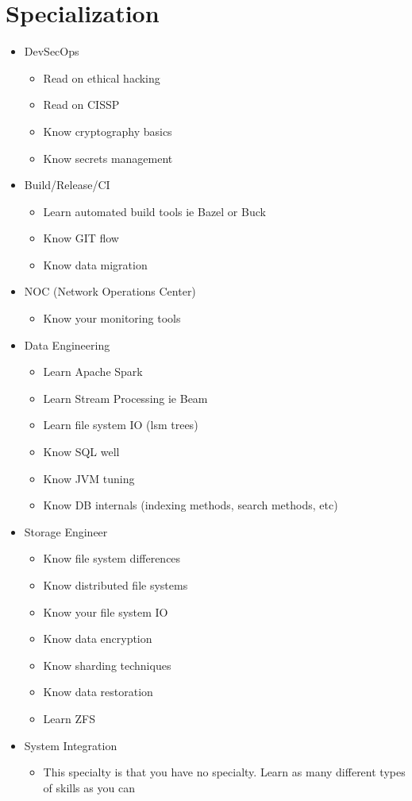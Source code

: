 \documentclass[12pt]{article}
\begin{document}
\section{Specialization}
\begin{itemize}
\item DevSecOps
  \begin{itemize}
  \item Read on ethical hacking
  \item Read on CISSP
  \item Know cryptography basics
  \item Know secrets management
  \end{itemize}
\item Build/Release/CI
  \begin{itemize}
  \item Learn automated build tools ie Bazel or Buck
  \item Know GIT flow
  \item Know data migration
  \end{itemize}
\item NOC (Network Operations Center)
  \begin{itemize}
  \item Know your monitoring tools
  \end{itemize}
\item Data Engineering\
  \begin{itemize}
  \item Learn Apache Spark
  \item Learn Stream Processing ie Beam
  \item Learn file system IO (lsm trees)
  \item Know SQL well
  \item Know JVM tuning
  \item Know DB internals (indexing methods, search methods, etc)
  \end{itemize}
\item Storage Engineer
  \begin{itemize}
  \item Know file system differences
  \item Know distributed file systems
  \item Know your file system IO
  \item Know data encryption
  \item Know sharding techniques
  \item Know data restoration
  \item Learn ZFS
  \end{itemize}
\item System Integration
  \begin{itemize}
  \item This specialty is that you have no specialty. Learn as many
    different types of skills as you can
  \end{itemize}
\end{itemize}
\end{document}
